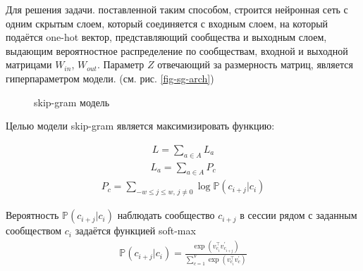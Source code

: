 \documentclass[times,specification,annotation]{itmo-student-thesis}
\begin{document}
Для решения задачи. поставленной таким способом, строится нейронная сеть с одним скрытым слоем, который соединяется с входным слоем, на который подаётся one-hot вектор, представляющий сообщества и выходным слоем, выдающим вероятностное распределение по сообществам, входной и выходной матрицами $W_{in}$, $W_{out}$. Параметр $Z$ отвечающий за размерность матриц, является гиперпараметром модели. (см. рис. \ref {fig-sg-arch})

\begin{figure}[!h]
\caption{skip-gram модель}\label{fig-sg}
\centering
{}
\end{figure}

Целью модели skip-gram является максимизировать функцию: 

\begin{align}
L = \sum_{a \in A}L_a
\label{eq1}
\end{align}
\begin{align}
L_a = \sum_{a \in A}P_c
\label{eq-a}
\end{align}
\begin{align}
P_c = \sum_{-w \leq j \leq w,\, j \ne 0}\log \mathbb{P}(c_{i + j} | c_i)  
\label{eq-opt-ses}
\end{align}

Вероятность $\mathbb{P}(c_{i + j} | c_i)$ наблюдать сообщество $c_{i + j}$ в сессии рядом с заданным сообществом $c_i$ задаётся функцией soft-max 
\begin{align}
\mathbb{P}(c_{i + j} | c_i) = \frac{\exp(v_{c_i}^\top v_{c_{i + j}}^{'})}{\sum_{c = 1}^{V}\exp(v_{c_i}^\top v_{c}^{'})}
\label{eq-softmax}
\end{align}
\end{document}
